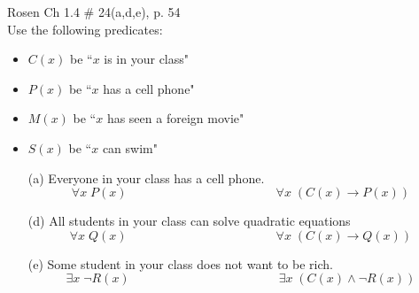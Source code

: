 \documentclass[12pt,addpoints]{exam}
\newcommand{\ra}{\rightarrow}
\begin{document}
\begin{questions}
\question Rosen Ch 1.4 \# 24(a,d,e), p. 54 \\
Use the following predicates:
\begin{itemize}[itemsep=0pt,parsep=0pt,topsep=0pt,partopsep=0pt]
    \item $C(x)$ be ``$x$ is in your class"
    \item $P(x)$ be ``$x$ has a cell phone"
    \item $M(x)$ be ``$x$ has seen a foreign movie"
    \item $S(x)$ be ``$x$ can swim"
\end{itemize}
    \ifprintanswers
        \vspace{-10pt}
    \fi
\begin{solution}
    \begin{itemize}[itemsep=0pt,parsep=0pt,topsep=0pt,partopsep=0pt]
        \item[(a)] Everyone in your class has a cell phone.
        $$ \forall x\; P(x) \hspace{2in} \forall x\; (C(x) \ra P(x))$$
        \item[(d)] All students in your class can solve quadratic equations
        $$ \forall x\; Q(x) \hspace{2in} \forall x\; (C(x) \ra Q(x))$$
        \item[(e)] Some student in your class does not want to be rich.
        $$ \exists x\; \neg R(x) \hspace{2in} \exists x\; (C(x) \wedge \neg R(x))$$
    \end{itemize}
\end{solution}



\end{questions}
\end{document}
